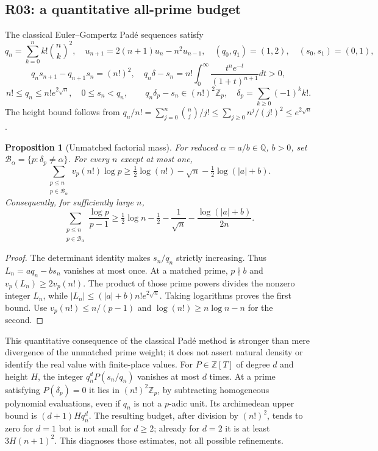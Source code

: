 \documentclass[11pt,a4paper]{article}
\newcommand{\Q}{\mathbb Q}
\newcommand{\Z}{\mathbb Z}
\newtheorem{proposition}[theorem]{Proposition}
\theoremstyle{definition}
\theoremstyle{remark}
\numberwithin{equation}{section}
\begin{document}
\subsection{R03: a quantitative all-prime budget}
The classical Euler--Gompertz Pad\'e sequences \cite{ar:MZ} satisfy
\[
 q_n=\sum_{k=0}^nk!\binom nk^2,\quad
 u_{n+1}=2(n+1)u_n-n^2u_{n-1},
 \quad(q_0,q_1)=(1,2),\quad(s_0,s_1)=(0,1),
\]
\[
 q_ns_{n+1}-q_{n+1}s_n=(n!)^2,\quad
 q_n\delta-s_n=n!\int_0^\infty\frac{t^ne^{-t}}{(1+t)^{n+1}}dt>0,
\]
\[
 n!\le q_n\le n!e^{2\sqrt n},\quad 0\le s_n<q_n,\qquad
 q_n\delta_p-s_n\in(n!)^2\Z_p,
 \quad \delta_p=\sum_{k\ge0}(-1)^kk!.
\]
The height bound follows from
$q_n/n!=\sum_{j=0}^n\binom nj/j!\le\sum_{j\ge0}n^j/(j!)^2
\le e^{2\sqrt n}$.

\begin{proposition}[Unmatched factorial mass]\label{ar:unmatched}
For reduced $\alpha=a/b\in\Q$, $b>0$, set
$\mathcal B_\alpha=\{p:\delta_p\ne\alpha\}$.  For every $n$ except
at most one,
\[
 \sum_{\substack{p\le n\\p\in\mathcal B_\alpha}}v_p(n!)\log p
 \ge\tfrac12\log(n!)-\sqrt n-\tfrac12\log(|a|+b).
\]
Consequently, for sufficiently large $n$,
\[
 \sum_{\substack{p\le n\\p\in\mathcal B_\alpha}}\frac{\log p}{p-1}
 \ge\tfrac12\log n-\tfrac12-\frac1{\sqrt n}
             -\frac{\log(|a|+b)}{2n}.
\]
\end{proposition}
\begin{proof}
The determinant identity makes $s_n/q_n$ strictly increasing.  Thus
$L_n=aq_n-bs_n$ vanishes at most once.  At a matched prime, $p\nmid b$
and $v_p(L_n)\ge2v_p(n!)$.  The product of those prime powers divides
the nonzero integer $L_n$, while
$|L_n|\le(|a|+b)n!e^{2\sqrt n}$.  Taking logarithms proves the first
bound.  Use $v_p(n!)\le n/(p-1)$ and $\log(n!)\ge n\log n-n$ for the second.
\end{proof}
This quantitative consequence of the classical Pad\'e method is stronger
than mere divergence of the unmatched prime weight; it does not assert
natural density or identify the real value with finite-place values.
For $P\in\Z[T]$ of degree $d$ and height $H$, the integer
$q_n^dP(s_n/q_n)$ vanishes at most $d$ times.  At a prime satisfying
$P(\delta_p)=0$ it lies in $(n!)^2\Z_p$, by subtracting homogeneous
polynomial evaluations, even if $q_n$ is not a $p$-adic unit.
Its archimedean upper bound is $(d+1)Hq_n^d$.  The resulting budget,
after division by $(n!)^2$, tends to zero for $d=1$ but is not small for
$d\ge2$; already for $d=2$ it is at least $3H(n+1)^2$.
This diagnoses those estimates, not all possible refinements.
\end{document}
